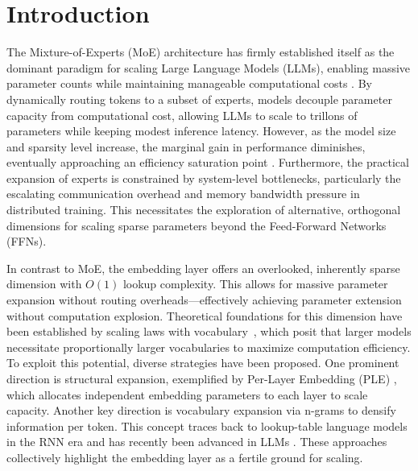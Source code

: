 \documentclass{article}
\begin{document}
\section{Introduction}
\label{sec:intro}
The Mixture-of-Experts (MoE) architecture has firmly established itself as the dominant paradigm for scaling Large Language Models (LLMs), enabling massive parameter counts while maintaining manageable computational costs \cite{gshard}. By dynamically routing tokens to a subset of experts, models decouple parameter capacity from computational cost, allowing LLMs to scale to trillons of parameters while keeping modest inference latency. However, as the model size and sparsity level increase, the marginal gain in performance diminishes, eventually approaching an efficiency saturation point \citep{apple_scaling}. Furthermore, the practical expansion of experts is constrained by system-level bottlenecks, particularly the escalating communication overhead and memory bandwidth pressure in distributed training. This necessitates the exploration of alternative, orthogonal dimensions for scaling sparse parameters beyond the Feed-Forward Networks (FFNs).

In contrast to MoE, the embedding layer offers an overlooked, inherently sparse dimension with $O(1)$ lookup complexity. This allows for massive parameter expansion without routing overheads—effectively achieving parameter extension without computation explosion. Theoretical foundations for this dimension have been established by scaling laws with vocabulary~\citep{tao2024scaling}, which posit that larger models necessitate proportionally larger vocabularies to maximize computation efficiency. To exploit this potential, diverse strategies have been proposed. One prominent direction is structural expansion, exemplified by Per-Layer Embedding (PLE) \citep{google2025gemma3n, STEM, rosa-plus-github}, which allocates independent embedding parameters to each layer to scale capacity. Another key direction is vocabulary expansion via n-grams to densify information per token. This concept traces back to lookup-table language models \citep{lookuplm} in the RNN era and has recently been advanced in LLMs \citep{clark-etal-2022-canine, huang2025overtokenizedtransformervocabularygenerally, pagnoni-etal-2025-byte, cheng2026conditional}. These approaches collectively highlight the embedding layer as a fertile ground for scaling.
\end{document}
